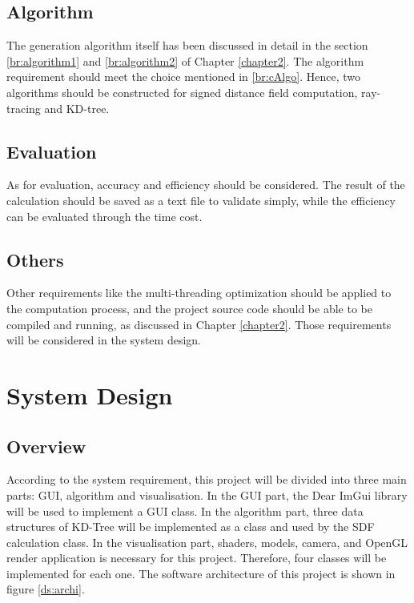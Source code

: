 \subsection{Algorithm}
\label{req:algo}

The generation algorithm itself has been discussed in detail in the section \ref{br:algorithm1} and \ref{br:algorithm2} of Chapter \ref{chapter2}. The algorithm requirement should meet the choice mentioned in \ref{br:cAlgo}. Hence, two algorithms should be constructed for signed distance field computation, ray-tracing \cite{AkenineMller2005FastMS} and KD-tree. 

\subsection{Evaluation}
\label{req:eva}

As for evaluation, accuracy and efficiency should be considered. The result of the calculation should be saved as a text file to validate simply, while the efficiency can be evaluated through the time cost. 

\subsection{Others}

Other requirements like the multi-threading optimization should be applied to the computation process, and the project source code should be able to be compiled and running, as discussed in Chapter \ref{chapter2}. Those requirements will be considered in the system design.

\section{System Design}

\subsection{Overview}

According to the system requirement, this project will be divided into three main parts: GUI, algorithm and visualisation. In the GUI part, the Dear ImGui library will be used to implement a GUI class. In the algorithm part, three data structures of KD-Tree will be implemented as a class and used by the SDF calculation class. In the visualisation part, shaders, models, camera, and OpenGL render application is necessary for this project. Therefore, four classes will be implemented for each one. The software architecture of this project is shown in figure \ref{ds:archi}.


